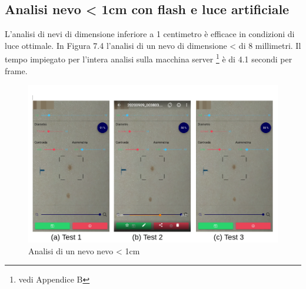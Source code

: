 {\subsection{Analisi nevo < 1cm con flash e luce artificiale} 
L'analisi di nevi di dimensione inferiore a 1 centimetro è efficace in condizioni di luce ottimale.
In Figura 7.4 l'analisi di un nevo di dimensione < di 8 millimetri.
Il tempo impiegato per l'intera analisi sulla macchina server \footnote{vedi Appendice B} è di 4.1 secondi per frame.
\begin{figure}[h]
	\begin{center}
		\includegraphics[scale=0.45]{figure/capitolo7/test4.png}
	\end{center}
	\caption{Analisi di un nevo nevo < 1cm}	
\end{figure}
\newpage
}
